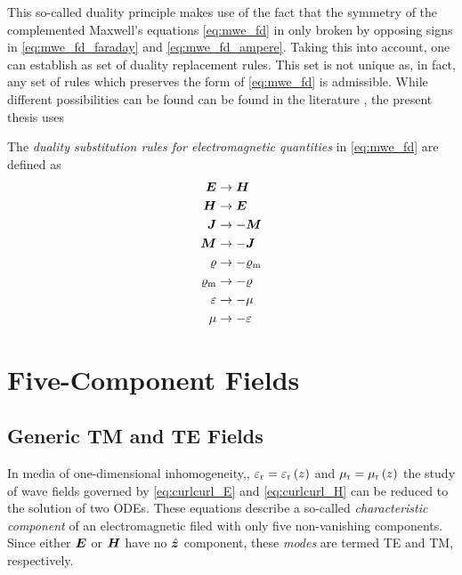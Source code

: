 This so-called duality principle makes use of the fact that the symmetry of the
complemented Maxwell's equations \eqref{eq:mwe_fd} in only broken by
opposing signs in \eqref{eq:mwe_fd_faraday} and \eqref{eq:mwe_fd_ampere}.
Taking this into account, one can establish as set of duality replacement rules.
This set is not unique as, in fact, any set of rules which preserves the form
of \eqref{eq:mwe_fd} is admissible.
While different possibilities can be found can be found in the literature
\cite{Jin2015,Harrington2001,Chew1999}, the present thesis uses
\begin{definition}
	The \emph{duality substitution rules for electromagnetic quantities} in
	\eqref{eq:mwe_fd} are defined as \cite[9]{Chew1999}
	\begin{subequations}
		\begin{align}
		\pvec{E} &\to \pvec{H} \\
		\pvec{H} &\to \pvec{E} \\
		\pvec{J} &\to -\pvec{M} \\
		\pvec{M} &\to -\pvec{J} \\
		\varrho &\to -\varrho_\mathrm{m} \\
		\varrho_\mathrm{m} &\to -\varrho \\
		\varepsilon &\to -\mu \\
		\mu &\to -\varepsilon 
		\end{align}
	\end{subequations}
\end{definition}











\section{Five-Component Fields}
\label{sec:five_component_fields}






\subsection{Generic \acs{TM} and \acs{TE} Fields}
\label{subsec:generic_TM_and_TE_fields}

In media of one-dimensional inhomogeneity,\ie, $\varepsilon_{\mathrm{r}} = \varepsilon_{\mathrm{r}}\left(z\right)$ and
$\mu_{\mathrm{r}} = \mu_{\mathrm{r}}\left(z\right)$ the study of wave fields governed by
\eqref{eq:curlcurl_E} and \eqref{eq:curlcurl_H} can be reduced to the solution
of two \acp{ODE}.
These equations describe a so-called \emph{characteristic component} of an
electromagnetic filed with only five non-vanishing components.
Since either $\pvec{E}$ or $\pvec{H}$ have no $\uv{z}$ component, these
\emph{modes} are termed \ac{TE} and \ac{TM}, respectively.

